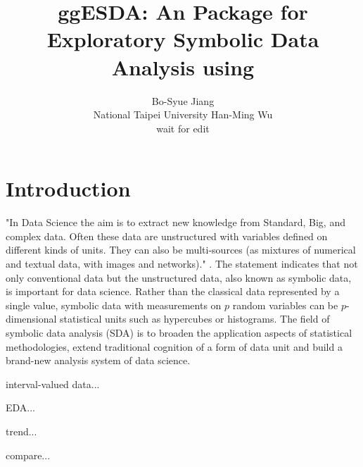 \documentclass[article]{jss}
\author{Bo-Syue Jiang\\National Taipei University
\And Han-Ming Wu\\wait for edit}
\title{ggESDA: An \proglang{R} Package for Exploratory Symbolic Data Analysis using \pkg{ggplot2}}
\begin{document}
\section{Introduction}
"In Data Science the aim is to extract new knowledge from Standard, Big, and complex data. Often these data are unstructured with variables defined on different kinds of units. They can also be multi-sources (as mixtures of numerical and textual data, with images and networks)." \cite{Diday:2018}. The statement indicates that not only conventional data but the unstructured data, also known as symbolic data, is important for data science. Rather than the classical data represented by a single value, symbolic data with measurements on $p$ random variables can be $p$-dimensional statistical units such as hypercubes or histograms. The field of symbolic data analysis (SDA) \cite{Billard+Diday:2007} is to broaden the application   aspects of statistical methodologies, extend traditional cognition of a form of data unit and build a brand-new analysis system of data science.




interval-valued data...

EDA...

trend...

compare...









\end{document}
